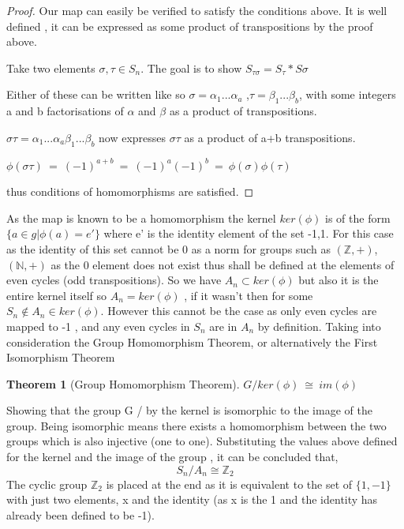 \documentclass{article}
\newtheorem{theorem}{Theorem}[section]
\begin{document}
\begin{proof}
\item Our map can easily be verified to satisfy the conditions above. It is well defined , it can be expressed as some product of transpositions by the proof above.
\item Take two elements $\sigma , \tau \in S_{n}$. The goal is to show $S_{\tau\sigma} = S_{\tau}*S{\sigma}$
\item Either of these can be written like so $\sigma = \alpha_{1} ... \alpha_{a}$ ,$\tau = \beta_{1} ... \beta_{b}$, with some integers a and b factorisations of $\alpha$ and $\beta$ as a product of transpositions. 
\item $\sigma\tau = \alpha_{1} ... \alpha_{a}\beta_{1} ... \beta_{b}$ now expresses $\sigma\tau$ as a product of a+b transpositions. 
\item $\phi(\sigma\tau)\ =\ (-1)^{a+b}\ =\ (-1)^{a}(-1)^{b}\ =\ \phi(\sigma)\phi(\tau)$
\item thus conditions of homomorphisms are satisfied.
\end{proof}
As the map is known to be a homomorphism the kernel $ker(\phi)$ is of the form $\{a \in g|\phi(a) =e'\}$ where e' is the identity element of the set {-1,1}. For this case as the identity of this set cannot be 0 as a norm for groups such as $(\mathbb{Z},+)$,$(\mathbb{N},+)$ as the 0 element does not exist thus shall be defined at the elements of even cycles (odd transpositions). So we have $A_{n}\subset ker(\phi)$ but also it is the entire kernel itself so $A_{n} = ker(\phi)$ , if it wasn't then for some $S_{n} \notin A_{n} \in ker(\phi)$. However this cannot be the case as only even cycles are mapped to -1 , and any even cycles in $S_{n}$ are in $A_{n}$ by definition.
Taking into consideration the Group Homomorphism Theorem, or alternatively the First Isomorphism Theorem  
\begin{theorem}[Group Homomorphism Theorem]
\label{eq:5}
$G/ker(\phi)\ \cong\ im(\phi)$
\end{theorem}
Showing that the group G / by the kernel is isomorphic to the image of the group. Being isomorphic means there exists a homomorphism between the two groups which is also injective (one to one).
Substituting the values above defined for the kernel and the image of the group , it can be concluded that,  
\begin{equation}\label{GHT}
S_{n}/A_{n} \cong \mathbb{Z}_{2}
\end{equation}
The cyclic group $\mathbb{Z}_{2}$ is placed at the end as it is equivalent to the set of $\{1,-1\}$ with just two elements, x and the identity (as x is the 1 and the identity has already been defined to be -1).
\end{document}
